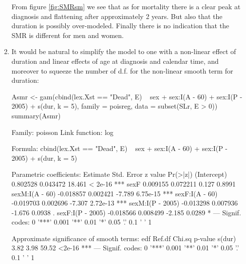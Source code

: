 \begin{enumerate}[resume]
From figure \ref{fig:SMRsm} we see that as for mortality there is a
clear peak at diagnosis and flattening after approximately 2
years. But also that the duration is possibly over-modeled. Finally
there is no indication that the SMR is different for men and women.


\item It would be natural to simplify the model to one with a non-linear
  effect of duration and linear effects of age at diagnosis and
  calendar time, and moreover to squeeze the number of d.f. for the
  non-linear smooth term for duration:
\begin{Schunk}
\begin{Sinput}
 Asmr <- gam(cbind(lex.Xst == "Dead", E) ~ sex +
                                           sex:I(A - 60) +
                                           sex:I(P - 2005) +
                                           s(dur, k = 5),
              family = poisreg,
                data = subset(SLr, E > 0))
 summary(Asmr)
\end{Sinput}
\begin{Soutput}
Family: poisson 
Link function: log 

Formula:
cbind(lex.Xst == "Dead", E) ~ sex + sex:I(A - 60) + sex:I(P - 
    2005) + s(dur, k = 5)

Parametric coefficients:
                  Estimate Std. Error z value Pr(>|z|)    
(Intercept)       0.802528   0.043472  18.461  < 2e-16 ***
sexF              0.009155   0.072211   0.127   0.8991    
sexM:I(A - 60)   -0.018857   0.002421  -7.789 6.75e-15 ***
sexF:I(A - 60)   -0.019703   0.002696  -7.307 2.72e-13 ***
sexM:I(P - 2005) -0.013298   0.007936  -1.676   0.0938 .  
sexF:I(P - 2005) -0.018566   0.008499  -2.185   0.0289 *  
---
Signif. codes:  0 '***' 0.001 '**' 0.01 '*' 0.05 '.' 0.1 ' ' 1

Approximate significance of smooth terms:
        edf Ref.df Chi.sq p-value    
s(dur) 3.82   3.98  59.52  <2e-16 ***
---
Signif. codes:  0 '***' 0.001 '**' 0.01 '*' 0.05 '.' 0.1 ' ' 1


\end{Soutput}
\end{Schunk}
\end{enumerate}
